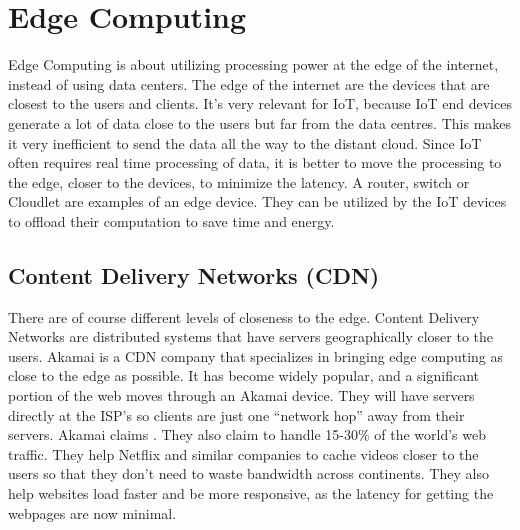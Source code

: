 \section{Edge Computing}
Edge Computing is about utilizing processing power at the edge of the internet, instead of using data centers. The edge of the internet are the devices that are closest to the users and clients. It's very relevant for IoT, because IoT end devices generate a lot of data close to the users but far from the data centres. This makes it very inefficient to send the data all the way to the distant cloud. Since IoT often requires real time processing of data, it is better to move the processing to the edge, closer to the devices, to minimize the latency\cite{shi_edge_2016}.
A router, switch or Cloudlet are examples of an edge device. They can be utilized by the IoT devices to offload their computation to save time and energy.

\subsection{Content Delivery Networks (CDN)}
There are of course different levels of closeness to the edge. Content Delivery Networks are distributed systems that have servers geographically closer to the users. Akamai is a CDN company that specializes in bringing edge computing as close to the edge as possible. It has become widely popular, and a significant portion of the web moves through an Akamai device. They will have servers directly at the ISP’s so clients are just one “network hop” away from their servers. Akamai\cite{noauthor_exceptional_nodate} claims . They also claim to handle 15-30\% of the world's web traffic. They help Netflix and similar companies to cache videos closer to the users so that they don't need to waste bandwidth across continents. They also help websites load faster and be more responsive, as the latency for getting the webpages are now minimal.



